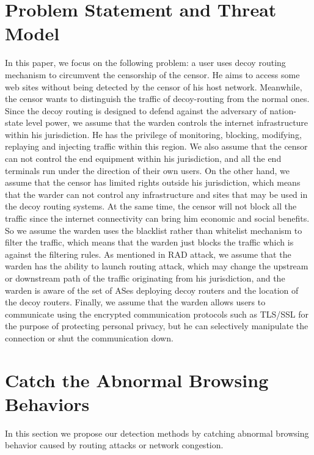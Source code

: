 \documentclass[conference]{IEEEtran}
\begin{document}
\section{Problem Statement and Threat Model}
In this paper, we focus on the following problem: a user uses decoy routing mechanism to circumvent the censorship of the censor. He aims to access some web sites without being detected by the censor of his host network. Meanwhile, the censor wants to distinguish the traffic of decoy-routing from the normal ones. Since the decoy routing is designed to defend against the adversary of nation-state level power, we assume that the warden controls the internet infrastructure within his jurisdiction. He has the privilege of monitoring, blocking, modifying, replaying and injecting traffic within this region. We also assume that the censor can not control the end equipment within his jurisdiction, and all the end terminals run under the direction of their own users. On the other hand, we assume that the censor has limited rights outside his jurisdiction, which means that the warder can not control any infrastructure and sites that may be used in the decoy routing systems. At the same time, the censor will not block all the traffic since the internet connectivity can bring him economic and social benefits. So we assume the warden uses the blacklist rather than whitelist mechanism to filter the traffic, which means that the warden just blocks the traffic which is against the filtering rules. As mentioned in RAD attack, we assume that the warden has the ability to launch routing attack, which may change the upstream or downstream path of the traffic originating from his jurisdiction, and the warden is aware of the set of ASes deploying decoy routers and the location of the decoy routers. Finally, we assume that the warden allows users to communicate using the encrypted communication protocols such as TLS/SSL for the purpose of protecting personal privacy, but he can selectively manipulate the connection or shut the communication down.
\section{Catch the Abnormal Browsing Behaviors}
In this section we propose our detection methods by catching abnormal browsing behavior caused by routing attacks or network congestion.
\end{document}
